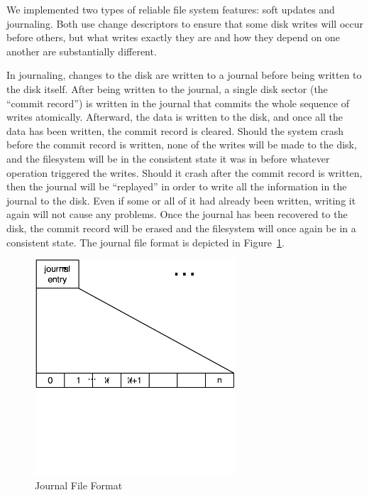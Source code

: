 We implemented two types of reliable file system features: soft updates and
journaling. Both use change descriptors to ensure that some disk writes will
occur before others, but what writes exactly they are and how they depend on one
another are substantially different.

In journaling, changes to the disk are written to a journal before being
written to the disk itself. After being written to the journal, a single disk
sector (the ``commit record'') is written in the journal that commits the whole
sequence of writes atomically. Afterward, the data is written to the disk, and
once all the data has been written, the commit record is cleared. Should the
system crash before the commit record is written, none of the writes will be
made to the disk, and the filesystem will be in the consistent state it was in
before whatever operation triggered the writes. Should it crash after the commit
record is written, then the journal will be ``replayed'' in order to write all
the information in the journal to the disk. Even if some or all of it had
already been written, writing it again will not cause any problems. Once the
journal has been recovered to the disk, the commit record will be erased and the
filesystem will once again be in a consistent state. The journal file format is
depicted in Figure~\ref{fig:journal}.

\begin{figure}[htb]
\begin{center}
  \includegraphics[width=7.5cm]{journal_diagram}
  \caption{Journal File Format}
  \label{fig:journal}
\end{center}
\end{figure}

